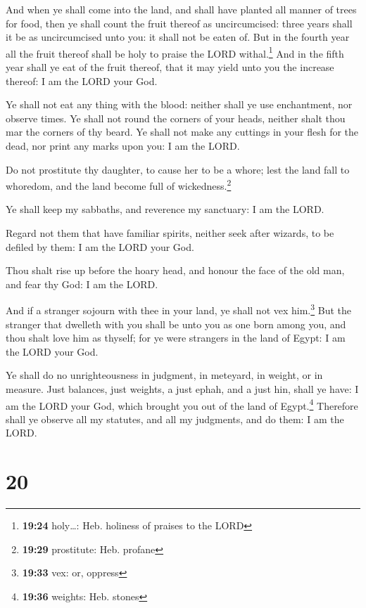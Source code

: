  And when ye shall come into the land, and shall have
planted all manner of trees for food, then ye shall count the fruit
thereof as uncircumcised: three years shall it be as uncircumcised unto
you: it shall not be eaten of.  But in the fourth year
all the fruit thereof shall be holy to praise the LORD
withal.\footnote{\textbf{19:24} holy\ldots: Heb. holiness of praises to
  the LORD}  And in the fifth year shall ye eat of the
fruit thereof, that it may yield unto you the increase thereof: I am the
LORD your God.

 Ye shall not eat any thing with the blood: neither shall
ye use enchantment, nor observe times.  Ye shall not
round the corners of your heads, neither shalt thou mar the corners of
thy beard.  Ye shall not make any cuttings in your flesh
for the dead, nor print any marks upon you: I am the LORD.

 Do not prostitute thy daughter, to cause her to be a
whore; lest the land fall to whoredom, and the land become full of
wickedness.\footnote{\textbf{19:29} prostitute: Heb. profane}

 Ye shall keep my sabbaths, and reverence my sanctuary: I
am the LORD.

 Regard not them that have familiar spirits, neither seek
after wizards, to be defiled by them: I am the LORD your God.

 Thou shalt rise up before the hoary head, and honour the
face of the old man, and fear thy God: I am the LORD.

 And if a stranger sojourn with thee in your land, ye
shall not vex him.\footnote{\textbf{19:33} vex: or, oppress}
 But the stranger that dwelleth with you shall be unto
you as one born among you, and thou shalt love him as thyself; for ye
were strangers in the land of Egypt: I am the LORD your God.

 Ye shall do no unrighteousness in judgment, in meteyard,
in weight, or in measure.  Just balances, just weights, a
just ephah, and a just hin, shall ye have: I am the LORD your God, which
brought you out of the land of Egypt.\footnote{\textbf{19:36} weights:
  Heb. stones}  Therefore shall ye observe all my
statutes, and all my judgments, and do them: I am the LORD.

\hypertarget{section-19}{%
\section{20}\label{section-19}}

